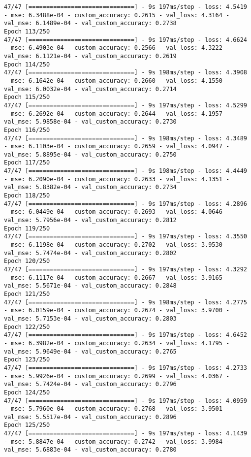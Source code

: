 \begin{lstlisting}
47/47 [==============================] - 9s 197ms/step - loss: 4.5419 - mse: 6.3488e-04 - custom_accuracy: 0.2615 - val_loss: 4.3164 - val_mse: 6.1489e-04 - val_custom_accuracy: 0.2738
Epoch 113/250
47/47 [==============================] - 9s 197ms/step - loss: 4.6624 - mse: 6.4903e-04 - custom_accuracy: 0.2566 - val_loss: 4.3222 - val_mse: 6.1121e-04 - val_custom_accuracy: 0.2619
Epoch 114/250
47/47 [==============================] - 9s 198ms/step - loss: 4.3908 - mse: 6.1642e-04 - custom_accuracy: 0.2660 - val_loss: 4.1550 - val_mse: 6.0032e-04 - val_custom_accuracy: 0.2714
Epoch 115/250
47/47 [==============================] - 9s 197ms/step - loss: 4.5299 - mse: 6.2692e-04 - custom_accuracy: 0.2644 - val_loss: 4.1957 - val_mse: 5.9858e-04 - val_custom_accuracy: 0.2730
Epoch 116/250
47/47 [==============================] - 9s 198ms/step - loss: 4.3489 - mse: 6.1103e-04 - custom_accuracy: 0.2659 - val_loss: 4.0947 - val_mse: 5.8895e-04 - val_custom_accuracy: 0.2750
Epoch 117/250
47/47 [==============================] - 9s 198ms/step - loss: 4.4449 - mse: 6.2090e-04 - custom_accuracy: 0.2633 - val_loss: 4.1351 - val_mse: 5.8382e-04 - val_custom_accuracy: 0.2734
Epoch 118/250
47/47 [==============================] - 9s 197ms/step - loss: 4.2896 - mse: 6.0449e-04 - custom_accuracy: 0.2693 - val_loss: 4.0646 - val_mse: 5.7956e-04 - val_custom_accuracy: 0.2812
Epoch 119/250
47/47 [==============================] - 9s 197ms/step - loss: 4.3550 - mse: 6.1198e-04 - custom_accuracy: 0.2702 - val_loss: 3.9530 - val_mse: 5.7474e-04 - val_custom_accuracy: 0.2802
Epoch 120/250
47/47 [==============================] - 9s 197ms/step - loss: 4.3292 - mse: 6.1117e-04 - custom_accuracy: 0.2667 - val_loss: 3.9165 - val_mse: 5.5671e-04 - val_custom_accuracy: 0.2848
Epoch 121/250
47/47 [==============================] - 9s 198ms/step - loss: 4.2775 - mse: 6.0159e-04 - custom_accuracy: 0.2674 - val_loss: 3.9700 - val_mse: 5.7153e-04 - val_custom_accuracy: 0.2803
Epoch 122/250
47/47 [==============================] - 9s 197ms/step - loss: 4.6452 - mse: 6.3982e-04 - custom_accuracy: 0.2634 - val_loss: 4.1795 - val_mse: 5.9649e-04 - val_custom_accuracy: 0.2765
Epoch 123/250
47/47 [==============================] - 9s 197ms/step - loss: 4.2733 - mse: 5.9926e-04 - custom_accuracy: 0.2699 - val_loss: 4.0367 - val_mse: 5.7424e-04 - val_custom_accuracy: 0.2796
Epoch 124/250
47/47 [==============================] - 9s 197ms/step - loss: 4.0959 - mse: 5.7960e-04 - custom_accuracy: 0.2768 - val_loss: 3.9501 - val_mse: 5.5517e-04 - val_custom_accuracy: 0.2896
Epoch 125/250
47/47 [==============================] - 9s 197ms/step - loss: 4.1439 - mse: 5.8847e-04 - custom_accuracy: 0.2742 - val_loss: 3.9984 - val_mse: 5.6883e-04 - val_custom_accuracy: 0.2780

\end{lstlisting}
